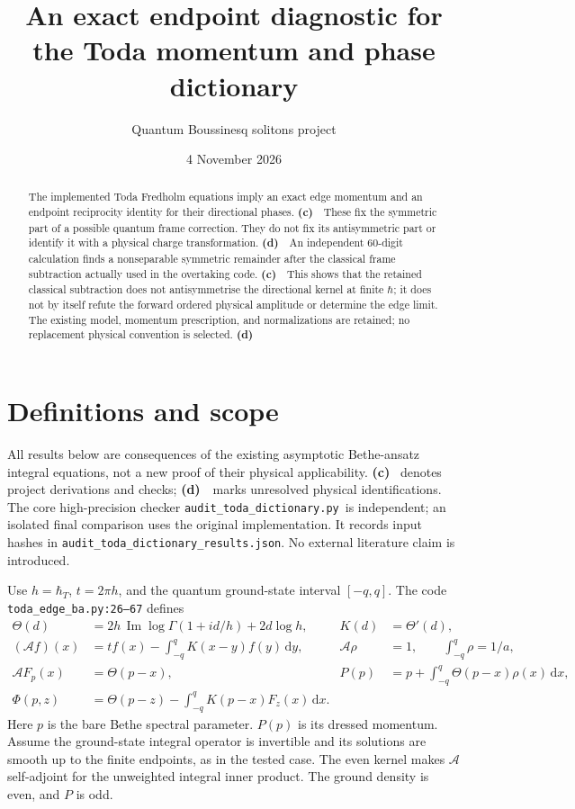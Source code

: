 \documentclass[11pt,a4paper]{article}
\title{An exact endpoint diagnostic for the Toda momentum and phase dictionary}
\author{Quantum Boussinesq solitons project}
\date{4 November 2026}
\newcommand{\Lc}{\textbf{(c)}\ }
\newcommand{\Ld}{\textbf{(d)}\ }
\newcommand{\scr}{\texttt{audit\_\allowbreak toda\_\allowbreak dictionary.py}}
\newcommand{\dd}{\mathrm d}
\begin{document}
\maketitle
\begin{abstract}
The implemented Toda Fredholm equations imply an exact edge momentum and an
endpoint reciprocity identity for their directional phases. \Lc\ These fix
the symmetric part of a possible quantum frame correction. They do not fix
its antisymmetric part or identify it with a physical charge transformation.
\Ld\ An independent 60-digit calculation finds a nonseparable symmetric
remainder after the classical frame subtraction actually used in the
overtaking code. \Lc\ This shows that the retained classical subtraction does not
antisymmetrise the directional kernel at finite $\hbar$; it does not
by itself refute the forward ordered physical amplitude or determine the
edge limit. The existing model, momentum prescription, and normalizations are
retained; no replacement physical convention is selected. \Ld
\end{abstract}

\section{Definitions and scope}
All results below are consequences of the existing asymptotic Bethe-ansatz
integral equations, not a new proof of their physical applicability. \Lc
denotes project derivations and checks; \Ld\ marks unresolved physical
identifications. The core high-precision checker \scr\ is independent;
an isolated final comparison uses the original implementation.
It records input hashes in \texttt{audit\_\allowbreak toda\_\allowbreak dictionary\_\allowbreak results.json}.
No external literature claim is introduced.

Use $h=\hbar_T$, $t=2\pi h$, and the quantum ground-state interval $[-q,q]$.
The code \texttt{toda\_\allowbreak edge\_\allowbreak ba.py:26--67} defines
\begin{align}
 \Theta(d)&=2h\,\operatorname{Im}\log\Gamma(1+id/h)+2d\log h,
 &K(d)&=\Theta'(d),\\
 (\mathcal A f)(x)&=tf(x)-\int_{-q}^q K(x-y)f(y)\,\dd y,
 &\mathcal A\rho&=1,\qquad \int_{-q}^q\rho=1/a,\\
 \mathcal A F_p(x)&=\Theta(p-x),
 &P(p)&=p+\int_{-q}^q\Theta(p-x)\rho(x)\,\dd x,\\
 \Phi(p,z)&=\Theta(p-z)-\int_{-q}^q K(p-x)F_z(x)\,\dd x.
 \label{eq:definitions}
\end{align}
Here $p$ is the bare Bethe spectral parameter. $P(p)$ is its dressed
momentum. Assume the ground-state integral operator is invertible and its
solutions are smooth up to the finite endpoints, as in the tested case.
The even kernel makes $\mathcal A$ self-adjoint for the unweighted integral
inner product. The ground density is even, and $P$ is odd.
\end{document}
